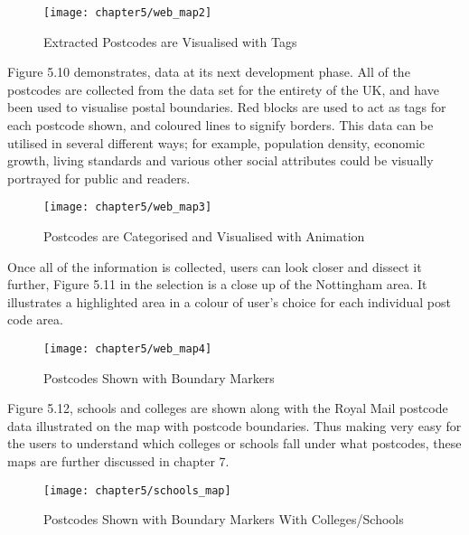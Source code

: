 \begin{figure}
\centering
\texttt{[image: chapter5/web\_map2]}
\caption{Extracted Postcodes are Visualised with Tags}
\end{figure}	
 
Figure 5.10 demonstrates, data at its next development phase. All of the postcodes are collected from the data set for the entirety of the UK, and have been used to visualise postal boundaries. Red blocks are used to act as tags for each postcode shown, and coloured lines to signify borders. This data can be utilised in several different ways; for example, population density, economic growth, living standards and various other social attributes could be visually portrayed for public and readers. 
 
\begin{figure}
\centering
\texttt{[image: chapter5/web\_map3]}
\caption{Postcodes are Categorised and Visualised with Animation}
\end{figure}

Once all of the information is collected, users can look closer and dissect it further, Figure 5.11 in the selection is a close up of the Nottingham area. It illustrates a highlighted area in a colour of user's choice for each individual post code area.
 
\begin{figure}
\centering
\texttt{[image: chapter5/web\_map4]}
\caption{Postcodes Shown with Boundary Markers}
\end{figure} 

Figure 5.12, schools and colleges are shown along with the Royal Mail postcode data illustrated on the map with postcode boundaries. Thus making very easy for the users to understand which colleges or schools fall under what postcodes, these maps are further discussed in chapter 7.

\begin{figure}
\centering
\texttt{[image: chapter5/schools\_map]}
\caption{Postcodes Shown with Boundary Markers With Colleges/Schools}
\end{figure} 


